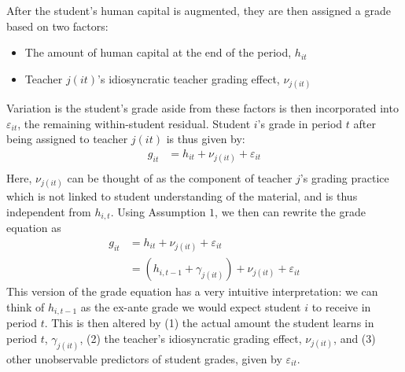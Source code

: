 \documentclass[../thesis_main.tex]{subfiles}
\begin{document}
\noindent After the student's human capital is augmented, they are then assigned a grade based on two factors:
\begin{itemize}
	\item The amount of human capital at the end of the period, $h_{it}$
	\item Teacher $j(it)$'s idiosyncratic teacher grading effect, $\nu_{j(it)}$
\end{itemize}
Variation is the student's grade aside from these factors is then incorporated into $\varepsilon_{it}$, the remaining within-student residual. Student $i$'s grade in period $t$ after being assigned to teacher $j(it)$ is thus given by:
\begin{equation}
\begin{split}
 	g_{it} & = h_{it}+\nu_{j(it)}+\varepsilon_{it}\\
\end{split}
\end{equation}
Here, $\nu_{j(it)}$ can be thought of as the component of teacher $j$'s grading practice which is not linked to student understanding of the material, and is thus independent from $h_{i,t}$. Using Assumption $1$, we then can rewrite the grade equation as 
\begin{equation}
\begin{split}
	\label{eqn:grade_eqn}
 	g_{it} & = h_{it}+\nu_{j(it)}+\varepsilon_{it}\\\
 	& = (h_{i,t-1} + \gamma_{j(it)}) + \nu_{j(it)} + \varepsilon_{it}
\end{split}
\end{equation}
This version of the grade equation has a very intuitive interpretation: we can think of $h_{i,t-1}$ as the ex-ante grade we would expect student $i$ to receive in period $t$. This is then altered by (1) the actual amount the student learns in period $t$, $\gamma_{j(it)}$, (2) the teacher's idiosyncratic grading effect, $\nu_{j(it)}$, and (3) other unobservable predictors of student grades, given by $\varepsilon_{it}$. 
\end{document}
